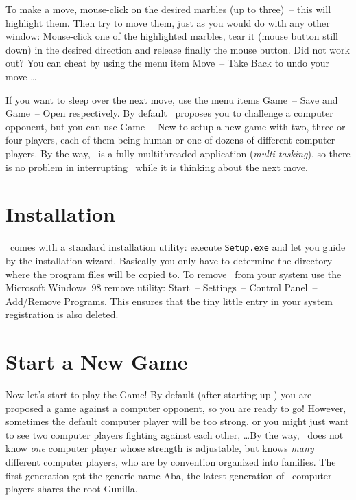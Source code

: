 To make a move, mouse-click on the desired marbles (up to three)~-- this will highlight them.
Then try to move them, just as you would do with any other window: Mouse-click one of the highlighted marbles, tear it (mouse button still down) in the desired direction and release finally the mouse button. Did not work out? You can cheat by using the menu item {\sf Move}~-- {\sf Take Back} to undo your move \ldots

If you want to sleep over the next move, use the menu items {\sf Game}~-- {\sf Save} and {\sf Game}~-- {\sf Open} respectively. By default \Malin\ proposes you to challenge a computer opponent, but you can use {\sf Game}~-- {\sf New} to setup a new game with two, three or four players, each of them being human or one of dozens of different computer players. By the way, \Malin\ is a fully multithreaded application (\emph{multi-tasking}), so there is no problem in interrupting \Malin\ while it is thinking about the next move.

\section{Installation}
\Malin\ comes with a standard installation utility: execute {\tt Setup.exe} and let you guide by the installation wizard. Basically you only have to determine the directory where the program files will be copied to. To remove \Malin\ from your system use the Microsoft Windows~98 remove utility: {\sf Start}~-- {\sf Settings}~-- {\sf Control Panel}~-- {\sf Add/Remove Programs}. This ensures that the tiny little entry in your system registration is also deleted.

\section{Start a New Game}
Now let's start to play the Game! By default (after starting up \Malin) you are proposed a game against a computer opponent, so you are ready to go! However, sometimes the default computer player will be too strong, or you might just want to see two computer players fighting against each other, \ldots By the way, \Malin\ does not know \emph{one} computer player whose strength is adjustable, but knows \emph{many} different computer players, who are by convention organized into families. The first generation got the generic name {\sf Aba}, the latest generation of \Malin\ computer players shares the root {\sf Gunilla}.

